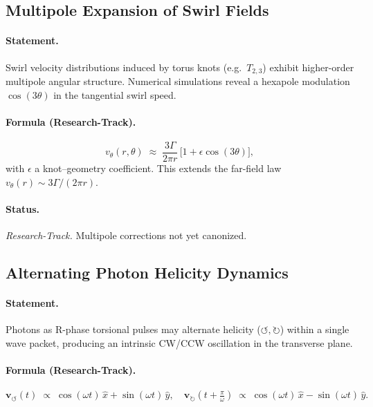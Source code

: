 \subsection{Multipole Expansion of Swirl Fields}
    \paragraph{Statement.}
        Swirl velocity distributions induced by torus knots (e.g.\ $T_{2,3}$) exhibit higher-order
        multipole angular structure. Numerical simulations reveal a hexapole modulation
        $\cos(3\theta)$ in the tangential swirl speed.

    \paragraph{Formula (Research-Track).}
        \[
            v_\theta(r,\theta) \;\approx\; \frac{3\Gamma}{2\pi r}\,\Big[1 + \epsilon \cos(3\theta)\Big],
        \]
        with $\epsilon$ a knot–geometry coefficient. This extends the far-field law
        $v_\theta(r)\sim 3\Gamma/(2\pi r)$.

    \paragraph{Status.} \emph{Research-Track.} Multipole corrections not yet canonized.

\subsection{Alternating Photon Helicity Dynamics}
\paragraph{Statement.}
    Photons as R-phase torsional pulses may alternate helicity ($\circlearrowleft,\circlearrowright$) within
    a single wave packet, producing an intrinsic CW/CCW oscillation in the transverse plane.

\paragraph{Formula (Research-Track).}
    \[
        \mathbf{v}_{\!\boldsymbol{\circlearrowleft}}(t) \;\propto\;
        \cos(\omega t)\,\hat{x} + \sin(\omega t)\,\hat{y},
        \quad
        \mathbf{v}_{\!\boldsymbol{\circlearrowright}}(t+\tfrac{\pi}{\omega})\;\propto\;
        \cos(\omega t)\,\hat{x} - \sin(\omega t)\,\hat{y}.
    \]

